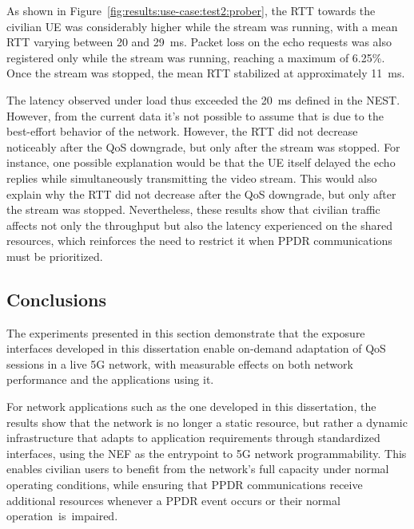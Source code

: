 As shown in Figure~\ref{fig:results:use-case:test2:prober}, the \acs{RTT} towards the civilian \acs{UE} was considerably higher while the stream was running, with a mean \acs{RTT} varying between 20 and 29~ms. Packet loss on the echo requests was also registered only while the stream was running, reaching a maximum of 6.25\%. Once the stream was stopped, the mean \acs{RTT} stabilized at approximately 11~ms. 

The latency observed under load thus exceeded the 20~ms defined in the \acs{NEST}. However, from the current data it's not possible to assume that is due to the best-effort behavior of the network. However, the \acs{RTT} did not decrease noticeably after the \acs{QoS} downgrade, but only after the stream was stopped. For instance, one possible explanation would be that the \acs{UE} itself delayed the echo replies while simultaneously transmitting the video stream. This would also explain why the \acs{RTT} did not decrease after the \acs{QoS} downgrade, but only after the stream was stopped. Nevertheless, these results show that civilian traffic affects not only the throughput but also the latency experienced on the shared resources, which reinforces the need to restrict it when \acs{PPDR} communications must be prioritized.

\subsection{Conclusions}
\label{chap:results:use-case:conclusion}

The experiments presented in this section demonstrate that the exposure interfaces developed in this dissertation enable on-demand adaptation of \acs{QoS} sessions in a live \acs{5G} network, with measurable effects on both network performance and the applications using it. 

For network applications such as the one developed in this dissertation, the results show that the network is no longer a static resource, but rather a dynamic infrastructure that adapts to application requirements through standardized interfaces, using the \acs{NEF} as the entrypoint to \acs{5G} network programmability. This enables civilian users to benefit from the network's full capacity under normal operating conditions, while ensuring that \acs{PPDR} communications receive additional resources whenever a \acs{PPDR} event occurs or their normal operation~is~impaired.
